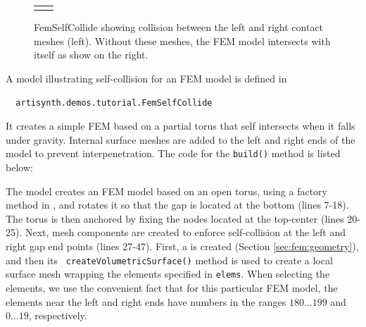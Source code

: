 \begin{figure}[ht]
\begin{center}
\begin{tabular}{cc}
\fi
\end{tabular}
\end{center}
\caption{FemSelfCollide showing collision between the left
and right contact meshes (left). Without these meshes, the FEM model
intersects with itself as show on the right.}
\label{FemSelfCollide:fig}
\end{figure}

A model illustrating self-collision for an FEM model is defined in
%
\begin{verbatim}
  artisynth.demos.tutorial.FemSelfCollide
\end{verbatim}
%
It creates a simple FEM based on a partial torus that self intersects
when it falls under gravity. Internal surface meshes are added to the
left and right ends of the model to prevent interpenetration.
The code for the {\tt build()} method is listed below:
%
\lstset{numbers=left} 
\iflatexml

\else

\fi
\lstset{numbers=none}

The model creates an FEM model based on an open torus, using a factory
method in , and
rotates it so that the gap is located at the bottom (lines 7-18).  The
torus is then anchored by fixing the nodes located at the top-center
(lines 20-25). Next, mesh components are created to enforce
self-collision at the left and right gap end points (lines 27-47).
First, a  is created
(Section \ref{sec:fem:geometry}), and then its {\tt
createVolumetricSurface()} method is used to create a local surface
mesh wrapping the elements specified in {\tt elems}. When selecting
the elements, we use the convenient fact that for this particular FEM
model, the elements near the left and right ends have numbers in the
ranges $180 \ldots 199$ and $0 \ldots 19$, respectively.

